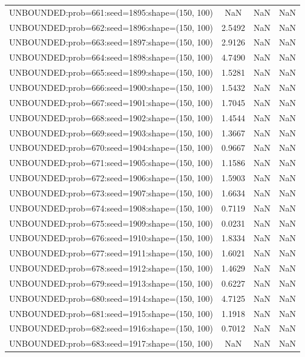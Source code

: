 \begin{longtable}{lccc}
UNBOUNDED:prob=661:seed=1895:shape=(150, 100) &     NaN &   NaN &    NaN \\
UNBOUNDED:prob=662:seed=1896:shape=(150, 100) &  2.5492 &   NaN &    NaN \\
UNBOUNDED:prob=663:seed=1897:shape=(150, 100) &  2.9126 &   NaN &    NaN \\
UNBOUNDED:prob=664:seed=1898:shape=(150, 100) &  4.7490 &   NaN &    NaN \\
UNBOUNDED:prob=665:seed=1899:shape=(150, 100) &  1.5281 &   NaN &    NaN \\
UNBOUNDED:prob=666:seed=1900:shape=(150, 100) &  1.5432 &   NaN &    NaN \\
UNBOUNDED:prob=667:seed=1901:shape=(150, 100) &  1.7045 &   NaN &    NaN \\
UNBOUNDED:prob=668:seed=1902:shape=(150, 100) &  1.4544 &   NaN &    NaN \\
UNBOUNDED:prob=669:seed=1903:shape=(150, 100) &  1.3667 &   NaN &    NaN \\
UNBOUNDED:prob=670:seed=1904:shape=(150, 100) &  0.9667 &   NaN &    NaN \\
UNBOUNDED:prob=671:seed=1905:shape=(150, 100) &  1.1586 &   NaN &    NaN \\
UNBOUNDED:prob=672:seed=1906:shape=(150, 100) &  1.5903 &   NaN &    NaN \\
UNBOUNDED:prob=673:seed=1907:shape=(150, 100) &  1.6634 &   NaN &    NaN \\
UNBOUNDED:prob=674:seed=1908:shape=(150, 100) &  0.7119 &   NaN &    NaN \\
UNBOUNDED:prob=675:seed=1909:shape=(150, 100) &  0.0231 &   NaN &    NaN \\
UNBOUNDED:prob=676:seed=1910:shape=(150, 100) &  1.8334 &   NaN &    NaN \\
UNBOUNDED:prob=677:seed=1911:shape=(150, 100) &  1.6021 &   NaN &    NaN \\
UNBOUNDED:prob=678:seed=1912:shape=(150, 100) &  1.4629 &   NaN &    NaN \\
UNBOUNDED:prob=679:seed=1913:shape=(150, 100) &  0.6227 &   NaN &    NaN \\
UNBOUNDED:prob=680:seed=1914:shape=(150, 100) &  4.7125 &   NaN &    NaN \\
UNBOUNDED:prob=681:seed=1915:shape=(150, 100) &  1.1918 &   NaN &    NaN \\
UNBOUNDED:prob=682:seed=1916:shape=(150, 100) &  0.7012 &   NaN &    NaN \\
UNBOUNDED:prob=683:seed=1917:shape=(150, 100) &     NaN &   NaN &    NaN \\

\end{longtable}
